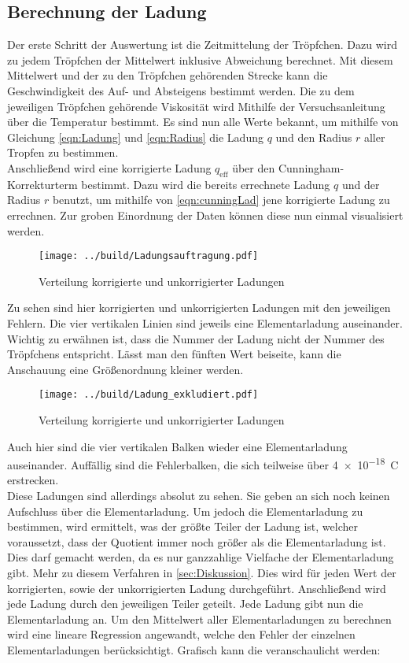 \subsection{Berechnung der Ladung}
Der erste Schritt der Auswertung ist die Zeitmittelung der Tröpfchen. Dazu wird zu jedem Tröpfchen der Mittelwert inklusive Abweichung berechnet. Mit diesem Mittelwert und der 
zu den Tröpfchen gehörenden Strecke kann die Geschwindigkeit des Auf- und Absteigens bestimmt werden.
Die zu dem jeweiligen Tröpfchen gehörende Viskosität wird Mithilfe der Versuchsanleitung über die Temperatur bestimmt. 
Es sind nun alle Werte bekannt, um mithilfe von Gleichung \eqref{eqn:Ladung} und \eqref{eqn:Radius} die Ladung $q$ und den Radius $r$ aller Tropfen zu 
bestimmen. \\
\noindent Anschließend wird eine korrigierte Ladung $q_\text{eff}$ über den Cunningham-Korrekturterm bestimmt. 
Dazu wird die bereits errechnete Ladung $q$ und der Radius $r$ benutzt, um mithilfe von \eqref{eqn:cunningLad} jene korrigierte Ladung zu errechnen.
Zur groben Einordnung der Daten können diese nun einmal visualisiert werden.

\begin{figure}
    \centering
    \texttt{[image: ../build/Ladungsauftragung.pdf]}
    \caption{Verteilung korrigierte und unkorrigierter Ladungen}
    \label{fig:Ladungsverteilung}
\end{figure}

\noindent Zu sehen sind hier korrigierten und unkorrigierten Ladungen mit den jeweiligen Fehlern. Die vier vertikalen Linien sind jeweils eine 
Elementarladung auseinander. Wichtig zu erwähnen ist, dass die Nummer der Ladung nicht der Nummer des Tröpfchens entspricht.
Lässt man den fünften Wert beiseite, kann die Anschauung eine Größenordnung kleiner werden. 

\begin{figure*}
    \centering
    \texttt{[image: ../build/Ladung\_exkludiert.pdf]}
    \caption{Verteilung korrigierte und unkorrigierter Ladungen}
\end{figure*}

\noindent Auch hier sind die vier vertikalen Balken wieder eine Elementarladung auseinander.
Auffällig sind die Fehlerbalken, die sich teilweise über \qty{4e-18}{\coulomb} erstrecken. \\
\noindent Diese Ladungen sind allerdings absolut zu sehen. Sie geben an sich noch keinen Aufschluss über die Elementarladung.
Um jedoch die Elementarladung zu bestimmen, wird ermittelt, was der größte Teiler der Ladung ist, welcher voraussetzt, dass der Quotient 
immer noch größer als die Elementarladung ist. Dies darf gemacht werden, da es nur ganzzahlige Vielfache der Elementarladung gibt. 
Mehr zu diesem Verfahren in \autoref{sec:Diskussion}. 
Dies wird für jeden Wert der korrigierten, sowie der unkorrigierten Ladung durchgeführt. 
Anschließend wird jede Ladung durch den jeweiligen Teiler geteilt. Jede Ladung gibt nun die Elementarladung an.
Um den Mittelwert aller Elementarladungen zu berechnen wird eine lineare Regression angewandt, welche den Fehler der einzelnen Elementarladungen 
berücksichtigt. Grafisch kann die veranschaulicht werden:

